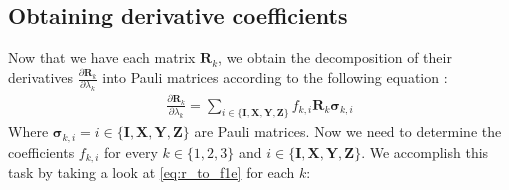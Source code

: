 \documentclass{aux/ttuthes2007}
\newcommand{\fpd}[2]{\frac{\partial #1}{\partial #2}}
\begin{document}
\subsection {\textbf{Obtaining derivative coefficients}}
%
Now that we have each matrix $\bm R_k$, we obtain the decomposition of their derivatives $\fpd{\bm R_k}{\lambda_k}$ into Pauli matrices according to the following equation \cite{benjamin}:
%
\begin{equation}\label{eq:r_to_f1e}
\begin{split}
	\fpd{\bm R_k}{\lambda_k} = \sum_{i \in \{\bm I, \bm X, \bm Y, \bm Z\}} f_{k, i} \bm R_k \bm \sigma_{k, i}
\end{split}
\end{equation}
%
Where $\bm \sigma_{k, i} = i \in \{\bm I, \bm X, \bm Y, \bm Z\}$ are Pauli matrices.
Now we need to determine the coefficients $f_{k, i}$ for every $k \in \{1, 2, 3\}$ and $i \in \{\bm I, \bm X, \bm Y, \bm Z\}$. We accomplish this task by taking a look at \ref{eq:r_to_f1e} for each $k$:
%
\end{document}
